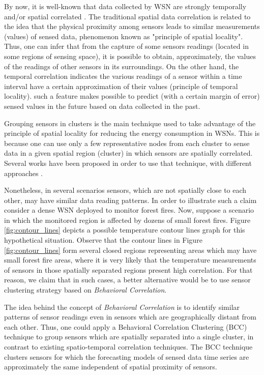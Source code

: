 \documentclass[conference]{IEEEtran}
\begin{document}
By now, it is well-known that data collected by WSN are strongly temporally
and/or spatial correlated \cite{Yoon2005, Chu2006}. The traditional spatial data
correlation is related to the idea that the physical proximity among sensors
leads to similar measurements (values) of sensed data, phenomenon known as
"principle of spatial locality". Thus, one can infer that from the capture of
some sensors readings (located in some regions of sensing space), it is possible
to obtain, approximately, the values of the readings of other sensors in its
surroundings. On the other hand, the temporal correlation indicates the various
readings of a sensor within a time interval have a certain approximation of
their values (principle of temporal locality). such a feature makes possible to
predict (with a certain margin of error) sensed values in the future based on
data collected in the past.

Grouping sensors in clusters is the main technique used to take advantage of the
principle of spatial locality for reducing the energy consumption in WSNs. This
is because one can use only a few representative nodes from each cluster to
sense data in a given spatial region (cluster) in which sensors are spatially
correlated.
Several works have been proposed in order to use that technique, with different
approaches \cite{Chu2006, Villas2012, Singh2010, Liu2007, Shah2007}.

Nonetheless, in several scenarios sensors, which are not spatially close to each
other, may have similar data reading patterns. In order to illustrate such a
claim consider a dense WSN deployed to monitor forest fires. 
Now, suppose a scenario in which the monitored region is affected by dozens of
small forest fires. Figure \ref{fig:contour_lines} depicts a possible temperature
contour lines graph for this hypothetical situation. Observe that the contour
lines in Figure \ref{fig:contour_lines} form several closed regions representing
areas which may have small forest fire areas, where it is very likely that the
temperature measurements of sensors in those spatially separated regions present
high correlation. For that reason, we claim that in such cases, a better
alternative would be to use sensor clustering strategy based on
\textit{Behavioral Correlation}.

The idea behind the concept of {\it Behavioral Correlation} is to identify
similar patterns of sensor readings even in sensors which are geographically
distant from each other. Thus, one could apply a Behavioral Correlation
Clustering (BCC) technique to group sensors which are spatially separated into a
single cluster, in contrast to existing spatio-temporal correlation techniques.
The BCC technique clusters sensors for which the forecasting models of sensed
data time series are approximately the same independent of spatial proximity of
sensors.
\end{document}
